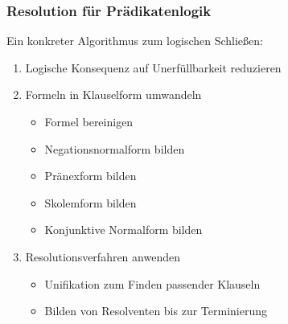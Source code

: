 \documentclass[onlymath]{beamer}
\begin{document}
\maketitle

\begin{frame}\frametitle{Resolution für Prädikatenlogik}

Ein konkreter Algorithmus zum logischen Schließen:
\begin{enumerate}[(1)]
\item \alert{Logische Konsequenz auf Unerfüllbarkeit reduzieren}
\item \alert{Formeln in Klauselform umwandeln}
	\begin{itemize}
	\item Formel bereinigen
	\item Negationsnormalform bilden
	\item Pränexform bilden
	\item Skolemform bilden
	\item Konjunktive Normalform bilden
	\end{itemize}
\item \alert{Resolutionsverfahren anwenden}
	\begin{itemize}
	\item \textcolor{devilscss}{Unifikation zum Finden passender Klauseln}
	\item \textcolor{devilscss}{Bilden von Resolventen bis zur Terminierung}
	\end{itemize}
\end{enumerate}

\end{frame}
\end{document}
